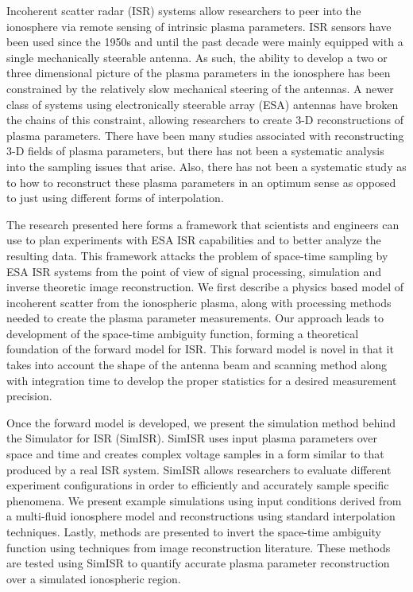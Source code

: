 
Incoherent scatter radar (ISR) systems allow researchers to peer into the ionosphere via remote sensing of intrinsic plasma parameters. ISR sensors have been used since the 1950s and until the past decade were mainly equipped with a single mechanically steerable antenna. As such, the ability to develop a two or three dimensional picture of the plasma parameters in the ionosphere has been constrained by the relatively slow mechanical steering of the antennas. A newer class of systems using electronically steerable array (ESA) antennas have broken the chains of this constraint, allowing researchers to create 3-D reconstructions of plasma parameters. There have been many studies associated with reconstructing 3-D fields of plasma parameters, but there has not been a systematic analysis into the sampling issues that arise. Also, there has not been a systematic study as to how to reconstruct these plasma parameters in an optimum sense as opposed to just using different forms of interpolation.

The research presented here forms a framework that scientists and engineers can use to plan experiments with ESA ISR capabilities and to better analyze the resulting data. This framework attacks the problem of space-time sampling by ESA ISR systems from the point of view of signal processing, simulation and inverse theoretic image reconstruction. We first describe a physics based model of incoherent scatter from the ionospheric plasma, along with processing methods needed to create the plasma parameter measurements. Our approach leads to development of the space-time ambiguity function, forming a theoretical foundation of the forward model for ISR. This forward model is novel in that it takes into account the shape of the antenna beam and scanning method along with integration time to develop the proper statistics for a desired measurement precision.

Once the forward model is developed, we present the simulation method behind the Simulator for ISR (SimISR). SimISR uses input plasma parameters over space and time and creates complex voltage samples in a form similar to that produced by a real ISR system. SimISR allows researchers to evaluate different experiment configurations in order to efficiently and accurately sample specific phenomena. We present example simulations using input conditions derived from a multi-fluid ionosphere model and reconstructions using standard interpolation techniques. Lastly, methods are presented to invert the space-time ambiguity function using techniques from image reconstruction literature. These methods are tested using SimISR to quantify accurate plasma parameter reconstruction over a simulated ionospheric region.
